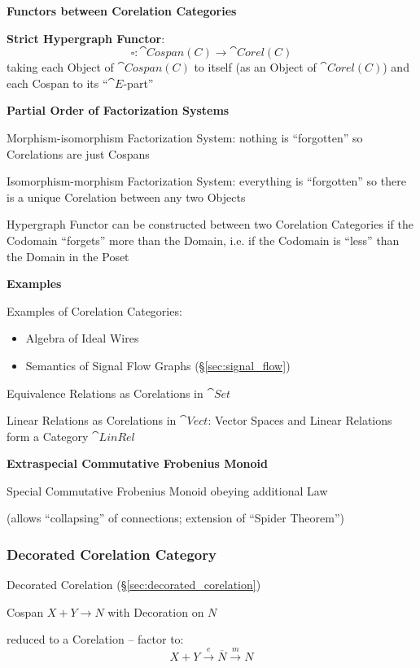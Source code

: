 \textbf{Functors between Corelation Categories}


\textbf{Strict Hypergraph Functor}:
\[
  \square : \cat{Cospan(C)} \rightarrow \cat{Corel(C)}
\]
taking each Object of $\cat{Cospan(C)}$ to itself (as an Object of
$\cat{Corel(C)}$) and each Cospan to its ``$\cat{E}$-part''


\textbf{Partial Order of Factorization Systems} %

Morphism-isomorphism Factorization System: nothing is ``forgotten'' so
Corelations are just Cospans

Isomorphism-morphism Factorization System: everything is ``forgotten''
so there is a unique Corelation between any two Objects

Hypergraph Functor can be constructed between two Corelation
Categories if the Codomain ``forgets'' more than the Domain, i.e. if
the Codomain is ``less'' than the Domain in the Poset


\textbf{Examples}

Examples of Corelation Categories:
\begin{itemize}
  \item Algebra of Ideal Wires
  \item Semantics of Signal Flow Graphs (\S\ref{sec:signal_flow})
\end{itemize}

Equivalence Relations as Corelations in $\cat{Set}$ %

Linear Relations as Corelations in $\cat{Vect}$:
Vector Spaces and Linear Relations form a Category $\cat{LinRel}$


\textbf{Extraspecial Commutative Frobenius Monoid}

Special Commutative Frobenius Monoid obeying additional Law

(allows ``collapsing'' of connections; extension of ``Spider
Theorem'')



\subsubsection{Decorated Corelation Category}
\label{sec:decorated_corelation_category}

Decorated Corelation (\S\ref{sec:decorated_corelation})

Cospan $X + Y \rightarrow N$ with Decoration on $N$

reduced to a Corelation -- factor to:
\[
  X + Y \xrightarrow{e} \overline{N} \xrightarrow{m} N
\]

